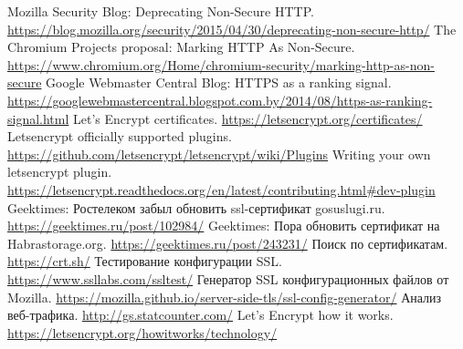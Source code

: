 \documentclass[10pt, a5paper]{article}
\begin{document}
\begin{thebibliography}{99}
 Mozilla Security Blog: Deprecating Non-Secure HTTP. \url{https://blog.mozilla.org/security/2015/04/30/deprecating-non-secure-http/} {}
The Chromium Projects proposal: Marking HTTP As Non-Secure. \url{https://www.chromium.org/Home/chromium-security/marking-http-as-non-secure}{}
Google Webmaster Central Blog: HTTPS as a ranking signal. \url{https://googlewebmastercentral.blogspot.com.by/2014/08/https-as-ranking-signal.html}{}
Let’s Encrypt certificates. \url{https://letsencrypt.org/certificates/}{}
Letsencrypt officially supported plugins. \url{https://github.com/letsencrypt/letsencrypt/wiki/Plugins}{}
Writing your own letsencrypt plugin. \url{https://letsencrypt.readthedocs.org/en/latest/contributing.html#dev-plugin}{}
Geektimes: Ростелеком забыл обновить ssl-сертификат gosuslugi.ru. \url{https://geektimes.ru/post/102984/}{}
Geektimes: Пора обновить сертификат на Habrastorage.org. \url{https://geektimes.ru/post/243231/}
Поиск по сертификатам. \url{https://crt.sh/}{}
Тестирование конфигурации SSL. \url{https://www.ssllabs.com/ssltest/}
Генератор SSL конфигурационных файлов от Mozilla. \url{https://mozilla.github.io/server-side-tls/ssl-config-generator/}{}
Анализ веб-трафика. \url{http://gs.statcounter.com/}{}
Let's Encrypt how it works. \url{https://letsencrypt.org/howitworks/technology/}{}
\end{thebibliography}
\end{document}
